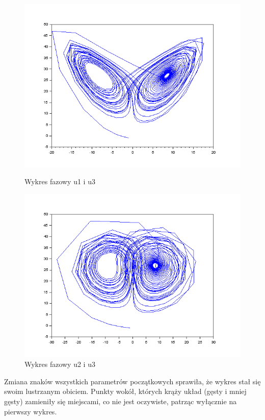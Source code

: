 \documentclass[12pt]{article}
\begin{document}
\begin{figure}[H]
\begin{minipage}[b]{0.49\textwidth}
    \includegraphics[scale=0.4]{./img/6--111-phase-1-3}
    \caption{Wykres fazowy u1 i u3}
    \end{minipage}
  \hfill
  \begin{minipage}[b]{0.49\textwidth}
    \includegraphics[scale=0.4]{./img/6--111-phase-2-3}
    \caption{Wykres fazowy u2 i u3}
  \end{minipage}
\end{figure}
Zmiana znaków wszystkich parametrów początkowych sprawiła, że wykres stał się swoim lustrzanym obiciem. Punkty wokół, których krąży układ (gęsty i mniej gęsty) zamieniły się miejscami, co nie jest oczywiste, patrząc wyłącznie na pierwszy wykres.
\end{document}
